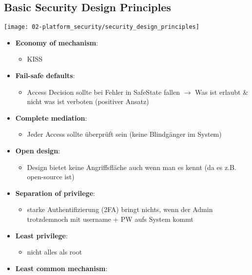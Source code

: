 \subsection{Basic Security Design Principles}
\begin{center}
    \vspace{-8pt}
    \texttt{[image: 02-platform\_security/security\_design\_principles]}
    \vspace{-8pt}
\end{center}

\begin{itemize}
    \item \textbf{Economy of mechanism}:
    \begin{itemize}
        \item KISS
    \end{itemize}
    \item \textbf{Fail-safe defaults}: 
    \begin{itemize}
        \item Access Decision sollte bei Fehler in Safe\-State fallen $\rightarrow$ Was ist erlaubt \& nicht was ist verboten (positiver Ansatz)
    \end{itemize}
    \item \textbf{Complete mediation}: 
    \begin{itemize}
        \item Jeder Access sollte überprüft sein (keine Blindgänger im System)
    \end{itemize}
    \item \textbf{Open design}: 
    \begin{itemize}
        \item Design bietet keine Angriffsfläche auch wenn man es kennt (da es z.B. open-source ist)
    \end{itemize}
    \item \textbf{Separation of privilege}:
    \begin{itemize}
        \item starke Authentifizierung (2FA) bringt nichts, wenn der Admin trotzdemnoch mit username + PW aufs System kommt
    \end{itemize}
    \item \textbf{Least privilege}: 
    \begin{itemize}
        \item nicht alles als root
    \end{itemize}
    \item \textbf{Least common mechanism}: 

\end{itemize}
